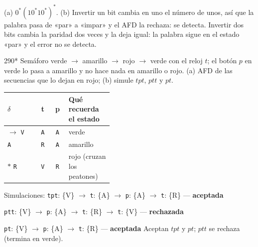\documentclass[11pt]{article}
\begin{document}
\resp (a) $0^*(10^*10^*)^*$. (b) Invertir un bit cambia en uno el número de unos, así que la palabra pasa de «par» a «impar» y el AFD la rechaza: se detecta. Invertir dos bits cambia la paridad dos veces y la deja igual: la palabra sigue en el estado «par» y el error no se detecta.


\begin{ejercicio}{290}{*}
Semáforo verde $\to$ amarillo $\to$ rojo $\to$ verde con el reloj $t$; el botón $p$ en verde lo pasa a amarillo y no hace nada en amarillo o rojo. (a) AFD de las secuencias que lo dejan en rojo; (b) simule $tpt$, $ptt$ y $pt$.
\end{ejercicio}
\proc \begin{center}\small\begin{tabular}{lccp{0.42\linewidth}}\toprule
$\delta$ & t & p & Qué recuerda el estado \\\midrule
$\to$ \texttt{V} & \texttt{A} & \texttt{A} & verde \\
 \texttt{A} & \texttt{R} & \texttt{A} & amarillo \\
$*$ \texttt{R} & \texttt{V} & \texttt{R} & rojo (cruzan los peatones) \\
\bottomrule\end{tabular}\end{center}
Simulaciones: \texttt{tpt}: \{V\} $\to$ \texttt{t}: \{A\} $\to$ \texttt{p}: \{A\} $\to$ \texttt{t}: \{R\} — \textbf{aceptada}\par \texttt{ptt}: \{V\} $\to$ \texttt{p}: \{A\} $\to$ \texttt{t}: \{R\} $\to$ \texttt{t}: \{V\} — \textbf{rechazada}\par \texttt{pt}: \{V\} $\to$ \texttt{p}: \{A\} $\to$ \texttt{t}: \{R\} — \textbf{aceptada}
\resp Aceptan $tpt$ y $pt$; $ptt$ se rechaza (termina en verde).
\end{document}
